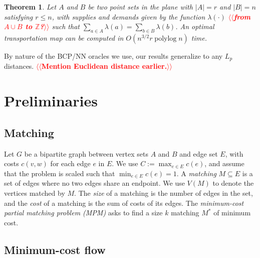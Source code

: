 \documentclass[11pt]{article}
\makeatletter
\def\polylog{\mathop{\mathrm{polylog}}}
\def\tsupply{\lambda}
\theoremstyle{plain}
\newtheorem{theorem}{Theorem}
\def\n@te#1{\textsf{\boldmath \textbf{$\langle\!\langle$#1$\rangle\!\rangle$}}\leavevmode}
\def\note#1{\textcolor{red}{\n@te{#1}}}
\makeatother
\begin{document}
\begin{theorem}
\label{theorem:orlin}
Let $A$ and $B$ be two point sets in the plane with $|A| = r$ and $|B| = n$ satisfying $r \le n$, with
supplies and demands given by the function $\tsupply(\cdot)$ \note{from $A\cup B$ to $\mathbb{Z}$?} such that
$\sum_{a \in A} \tsupply(a) = \sum_{b \in B} \tsupply(b)$.
An optimal transportation map can be computed in $O(n^{3/2}r\polylog n)$ time.
\end{theorem}



By nature of the BCP/NN oracles we use, our results generalize to any $L_p$ distances. \note{Mention Euclidean distance earlier.}


\section{Preliminaries}
\label{section:prelim}

\subsection{Matching}

Let $G$ be a bipartite graph between vertex sets $A$ and $B$ and edge set $E$,
with costs $c(v, w)$ for each edge $e$ in $E$.
We use $C := \max_{e \in E} c(e)$, and assume that the problem is scaled such
that $\min_{e \in E} c(e) = 1$.
A \emph{matching} $M \subseteq E$ is a set of edges where no two edges share an
endpoint.
We use $V(M)$ to denote the vertices matched by $M$.
The \emph{size} of a matching is the number of edges in the set, and the
\emph{cost} of a matching is the sum of costs of its edges.
The \emph{minimum-cost partial matching problem (MPM)} asks to find a size $k$
matching $M^*$ of minimum cost.

\subsection{Minimum-cost flow}
\end{document}
